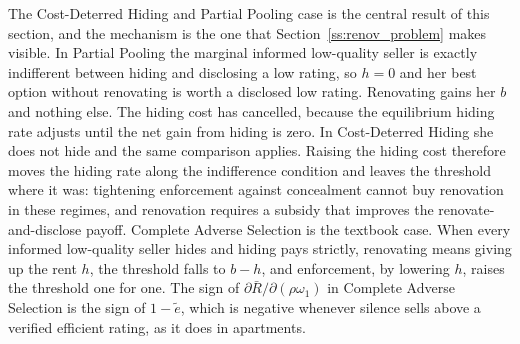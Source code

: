 The Cost-Deterred Hiding and Partial Pooling case is the central result of this section, and the mechanism is the one that Section~\ref{ss:renov_problem} makes visible. In Partial Pooling the marginal informed low-quality seller is exactly indifferent between hiding and disclosing a low rating, so $h=0$ and her best option without renovating is worth a disclosed low rating. Renovating gains her $b$ and nothing else. The hiding cost has cancelled, because the equilibrium hiding rate adjusts until the net gain from hiding is zero. In Cost-Deterred Hiding she does not hide and the same comparison applies. Raising the hiding cost therefore moves the hiding rate along the indifference condition and leaves the threshold where it was: tightening enforcement against concealment cannot buy renovation in these regimes, and renovation requires a subsidy that improves the renovate-and-disclose payoff. Complete Adverse Selection is the textbook case. When every informed low-quality seller hides and hiding pays strictly, renovating means giving up the rent $h$, the threshold falls to $b-h$, and enforcement, by lowering $h$, raises the threshold one for one. The sign of $\partial\bar R/\partial(\rho\omega_1)$ in Complete Adverse Selection is the sign of $1-\tilde e$, which is negative whenever silence sells above a verified efficient rating, as it does in apartments.
